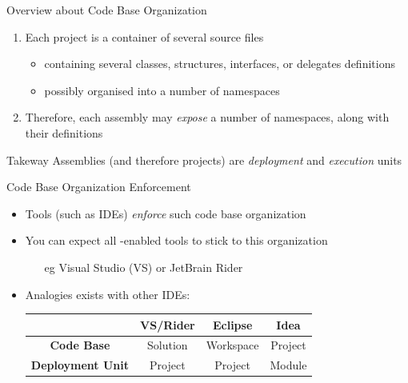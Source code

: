 \documentclass[presentation]{beamer}
\begin{document}
\begin{frame}[allowframebreaks]{Overview about Code Base Organization}
\begin{enumerate}
        \medskip

        \item Each project is a container of several \alert{source} files 
        \begin{itemize}
            \item containing several classes, structures, interfaces, or delegates definitions
            \item possibly organised into a number of \alert{namespaces}
        \end{itemize}

        \medskip

        \item Therefore, each assembly may \emph{expose} a number of namespaces, along with their definitions
    \end{enumerate}

    \bigskip

    \begin{block}{Takeway}\centering
        Assemblies (and therefore projects) are \emph{deployment} and \emph{execution} \alert{units}
    \end{block}
\end{frame}

\begin{frame}{Code Base Organization Enforcement}
    \begin{itemize}
        \item Tools (such as IDEs) \emph{enforce} such code base organization
        
        \bigskip

        \item You can expect all \dotnet-enabled tools to stick to this organization
        \begin{itemize}
            \item[eg] Visual Studio (VS) or JetBrain Rider
        \end{itemize}

        \bigskip

        \item Analogies exists with other IDEs:
        \smallskip
        \begin{center}
            \begin{tabular}{c||c|c|c}
                & \textbf{VS/Rider} & \textbf{Eclipse} & \textbf{Idea} \\
                \hline\hline
                \textbf{Code Base}       & Solution          & Workspace        & Project       \\
                \hline
                \textbf{Deployment Unit} & Project           & Project          & Module       
            \end{tabular}
        \end{center}
    \end{itemize}
\end{frame}
\end{document}
